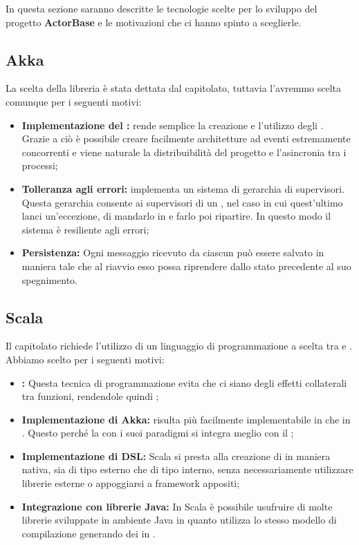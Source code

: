 \documentclass{scalatekids-article}
\begin{document}
In questa sezione saranno descritte le tecnologie scelte per lo sviluppo del
progetto \textbf{ActorBase} e le motivazioni che ci hanno spinto a sceglierle.

\subsection{Akka}

La scelta della libreria  è stata dettata dal capitolato, tuttavia
l'avremmo scelta comunque per i seguenti motivi:
\begin{itemize}
\item\textbf{Implementazione del :} 
  rende semplice la creazione e l'utilizzo degli . Grazie a ciò è
  possibile creare facilmente architetture ad eventi estremamente concorrenti e
  viene naturale la distribuibilità del progetto e l'asincronia tra i processi;
\item\textbf{Tolleranza agli errori:}  implementa un sistema di
  gerarchia di supervisori. Questa gerarchia consente ai supervisori di un
  , nel caso in cui quest'ultimo lanci un'eccezione, di mandarlo
  in  e farlo poi ripartire. In questo modo il sistema è resiliente
  agli errori;
\item\textbf{Persistenza:} Ogni messaggio ricevuto da ciascun 
  può essere salvato in maniera tale che al riavvio esso possa riprendere dallo
  stato precedente al suo spegnimento.
\end{itemize}

\subsection{Scala}

Il capitolato richiede l'utilizzo di un linguaggio di programmazione a scelta
tra  e . Abbiamo scelto  per i seguenti
motivi:

\begin{itemize}
\item\textbf{:} Questa tecnica di
  programmazione evita che ci siano degli effetti collaterali tra funzioni,
  rendendole quindi ;
\item\textbf{Implementazione di Akka:}  risulta più
  facilmente implementabile in  che in . Questo perché
  la  con i suoi paradigmi si integra meglio
  con il ;
\item\textbf{Implementazione di DSL:} Scala si presta alla creazione di 
  in maniera nativa, sia di tipo esterno che di tipo interno, senza necessariamente
  utilizzare librerie esterne o appoggiarsi a framework appositi;
\item\textbf{Integrazione con librerie Java:} In Scala è possibile usufruire di molte
  librerie sviluppate in ambiente Java in quanto utilizza lo stesso modello di compilazione
  generando dei  in .
\end{itemize}
\end{document}
